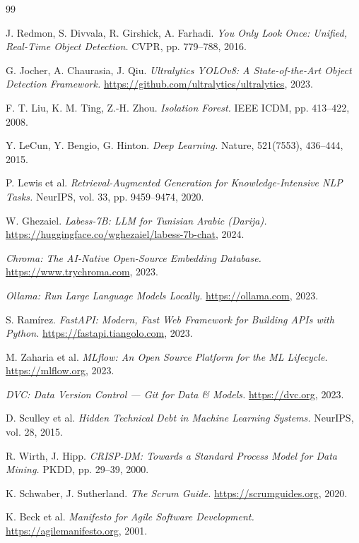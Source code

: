 \documentclass[12pt,a4paper,oneside]{report}
\begin{document}
\begin{thebibliography}{99}

J. Redmon, S. Divvala, R. Girshick, A. Farhadi.
\textit{You Only Look Once: Unified, Real-Time Object Detection.}
CVPR, pp. 779--788, 2016.

G. Jocher, A. Chaurasia, J. Qiu.
\textit{Ultralytics YOLOv8: A State-of-the-Art Object Detection Framework.}
\url{https://github.com/ultralytics/ultralytics}, 2023.

F. T. Liu, K. M. Ting, Z.-H. Zhou.
\textit{Isolation Forest.}
IEEE ICDM, pp. 413--422, 2008.

Y. LeCun, Y. Bengio, G. Hinton.
\textit{Deep Learning.}
Nature, 521(7553), 436--444, 2015.

P. Lewis et al.
\textit{Retrieval-Augmented Generation for Knowledge-Intensive NLP Tasks.}
NeurIPS, vol. 33, pp. 9459--9474, 2020.

W. Ghezaiel.
\textit{Labess-7B: LLM for Tunisian Arabic (Darija).}
\url{https://huggingface.co/wghezaiel/labess-7b-chat}, 2024.

\textit{Chroma: The AI-Native Open-Source Embedding Database.}
\url{https://www.trychroma.com}, 2023.

\textit{Ollama: Run Large Language Models Locally.}
\url{https://ollama.com}, 2023.

S. Ramírez.
\textit{FastAPI: Modern, Fast Web Framework for Building APIs with Python.}
\url{https://fastapi.tiangolo.com}, 2023.

M. Zaharia et al.
\textit{MLflow: An Open Source Platform for the ML Lifecycle.}
\url{https://mlflow.org}, 2023.

\textit{DVC: Data Version Control — Git for Data \& Models.}
\url{https://dvc.org}, 2023.

D. Sculley et al.
\textit{Hidden Technical Debt in Machine Learning Systems.}
NeurIPS, vol. 28, 2015.

R. Wirth, J. Hipp.
\textit{CRISP-DM: Towards a Standard Process Model for Data Mining.}
PKDD, pp. 29--39, 2000.

K. Schwaber, J. Sutherland.
\textit{The Scrum Guide.}
\url{https://scrumguides.org}, 2020.

K. Beck et al.
\textit{Manifesto for Agile Software Development.}
\url{https://agilemanifesto.org}, 2001.


\end{thebibliography}
\end{document}
